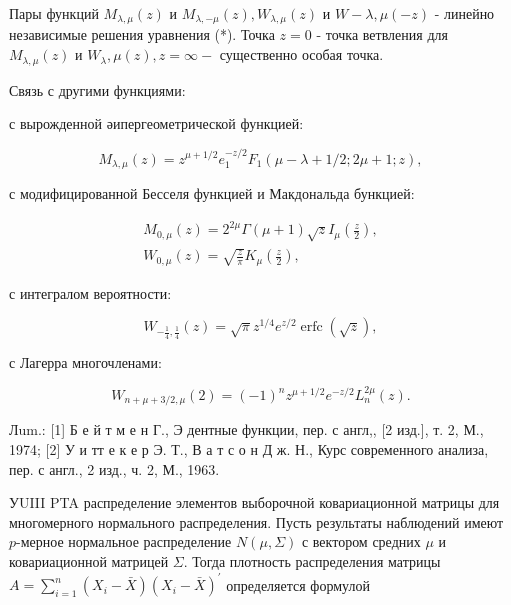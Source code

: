 \documentclass[10pt]{article}
\begin{document}
Пары функций $M_{\lambda, \mu}(z)$ и $M_{\lambda,-\mu}(z), W_{\lambda, \mu}(z)$ и $W-\lambda, \mu(-z)$ - линейно независимые решения уравнения (*). Точка $z=0$ - точка ветвления для $M_{\lambda, \mu}(z)$ и $W_{\lambda}, \mu(z), z=\infty-$ существенно особая точка.



Связь с другими функциями:



с вырожденной әипергеометрической функцией:



\[

M_{\lambda, \mu}(z)=z^{\mu+1 / 2} e_{1}^{-z / 2} F_{1}(\mu-\lambda+1 / 2 ; 2 \mu+1 ; z),

\]



с модифицированной Бесселя функцией и Макдональда бункцией:



\[

\begin{gathered}

M_{0, \mu}(z)=2^{2 \mu} \Gamma(\mu+1) \sqrt{z} I_{\mu}\left(\frac{z}{2}\right), \\

W_{0, \mu}(z)=\sqrt{\frac{z}{\pi}} K_{\mu}\left(\frac{z}{2}\right),

\end{gathered}

\]



с интегралом вероятности:



\[

W_{-\frac{1}{4}, \frac{1}{4}}(z)=\sqrt{\pi} z^{1 / 4} e^{z / 2} \operatorname{erfc}(\sqrt{z}),

\]



с Лагерра многочленами:



\[

W_{n+\mu+3 / 2, \mu}(2)=(-1)^{n} z^{\mu+1 / 2} e^{-z / 2} L_{n}^{2 \mu}(z) .

\]



Лum.: [1] Б е й т м е н Г., Э дентные функции, пер. с англ,, [2 изд.], т. 2, М., 1974; [2] У и тт е к е р Э. Т., В а т с о н Д ж. Н., Курс современного анализа, пер. с англ., 2 изд., ч. 2, М., 1963.



УUIII PTA распределение элементов выборочной ковариационной матрицы для многомерного нормального распределения. Пусть результаты наблюдений имеют $p$-мерное нормальное распределение $N(\mu, \Sigma)$ с вектором средних $\mu$ и ковариационной матрицей $\Sigma$. Тогда плотность распределения матрицы $A=\sum_{i=1}^{n}\left(X_{i}-\bar{X}\right)\left(X_{i}-\bar{X}\right)^{\prime}$ определяется формулой
\end{document}
